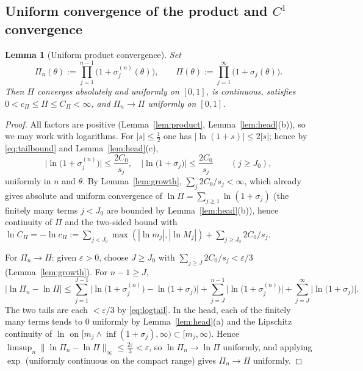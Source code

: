 \documentclass[11pt]{article}
\newtheorem{lemma}[theorem]{Lemma}
\theoremstyle{definition}
\theoremstyle{remark}
\begin{document}
\subsection{Uniform convergence of the product and $C^{1}$ convergence}

\begin{lemma}[Uniform product convergence]\label{lem:prodconv}
Set
\[
\Pi_n(\theta):=\prod_{j=1}^{n-1}\big(1+\sigma_j^{(n)}(\theta)\big),
\qquad
\Pi(\theta):=\prod_{j=1}^{\infty}\big(1+\sigma_j(\theta)\big).
\]
Then $\Pi$ converges absolutely and uniformly on $[0,1]$, is continuous,
satisfies $0<c_\Pi\le\Pi\le C_\Pi<\infty$, and $\Pi_n\to\Pi$ uniformly on
$[0,1]$.
\end{lemma}

\begin{proof}
All factors are positive (Lemma~\ref{lem:product},
Lemma~\ref{lem:head}(b)), so we may work with logarithms. For
$|s|\le\frac12$ one has $|\ln(1+s)|\le 2|s|$; hence by
\eqref{eq:tailbound} and Lemma~\ref{lem:head}(c),
\begin{equation}\label{eq:logtail}
\big|\ln\big(1+\sigma_j^{(n)}\big)\big|\le\frac{2C_0}{s_j},
\quad
\big|\ln\big(1+\sigma_j\big)\big|\le\frac{2C_0}{s_j}
\qquad (j\ge J_0),
\end{equation}
uniformly in $n$ and $\theta$. By Lemma~\ref{lem:growth},
$\sum_j 2C_0/s_j<\infty$, which already gives absolute and uniform
convergence of $\ln\Pi=\sum_{j\ge1}\ln(1+\sigma_j)$ (the finitely many
terms $j<J_0$ are bounded by Lemma~\ref{lem:head}(b)), hence continuity
of $\Pi$ and the two-sided bound with
$\ln C_\Pi=-\ln c_\Pi:=\sum_{j<J_0}\max(|\ln m_j|,|\ln M_j|)
+\sum_{j\ge J_0}2C_0/s_j$.

For $\Pi_n\to\Pi$: given $\varepsilon>0$, choose $J\ge J_0$ with
$\sum_{j\ge J}2C_0/s_j<\varepsilon/3$ (Lemma~\ref{lem:growth}). For
$n-1\ge J$,
\[
\big|\ln\Pi_n-\ln\Pi\big|
\le\sum_{j=1}^{J-1}\Big|\ln\big(1+\sigma_j^{(n)}\big)-\ln\big(1+\sigma_j\big)\Big|
+\sum_{j=J}^{n-1}\big|\ln\big(1+\sigma_j^{(n)}\big)\big|
+\sum_{j=J}^{\infty}\big|\ln\big(1+\sigma_j\big)\big| .
\]
The two tails are each $<\varepsilon/3$ by \eqref{eq:logtail}. In the
head, each of the finitely many terms tends to $0$ uniformly by
Lemma~\ref{lem:head}(a) and the Lipschitz continuity of $\ln$ on
$[m_j\wedge\inf(1+\sigma_j),\infty)\subset[m_j,\infty)$. Hence
$\limsup_n\|\ln\Pi_n-\ln\Pi\|_\infty\le\tfrac{2\varepsilon}{3}<\varepsilon$,
so $\ln\Pi_n\to\ln\Pi$ uniformly, and applying $\exp$ (uniformly
continuous on the compact range) gives $\Pi_n\to\Pi$ uniformly.
\end{proof}
\end{document}
